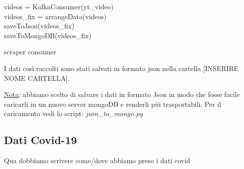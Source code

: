\begin{algorithm}[H]
	\nl {} {
		\nl {}
		{
			\nl videos = KafkaConsumer(yt\_video)\\
			\nl videos\_fix = arrangeData(videos)\\ 
			\nl saveToJson(videos\_fix)\\
			\nl saveToMongoDB(videos\_fix)
		}
	}
	\caption{scraper consumer}
\end{algorithm}
I dati così raccolti sono stati salvati in formato json nella cartella [INSERIRE NOME CARTELLA].

\underline{Nota}: abbiamo scelto di salvare i dati in formato Json in modo che fosse facile caricarli in un nuovo server mongoDB e renderli più trasportabili. Per il caricamento vedi lo script: \textit{json\_to\_mongo.py}

\subsection*{Dati Covid-19}
Qua dobbiamo scrivere come/dove abbiamo preso i dati covid
